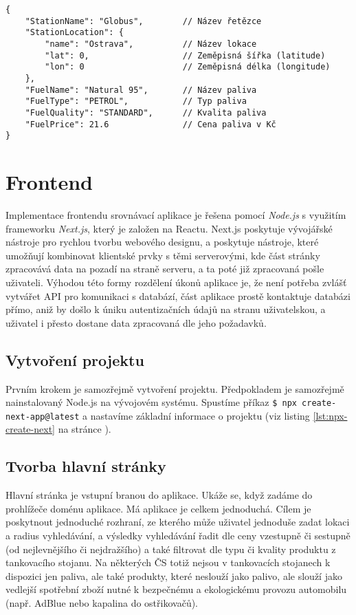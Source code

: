 \begin{lstlisting}[caption={JSON formát dat pro logovací knihovnu},label=lst:dbdata-json]
{
    "StationName": "Globus",        // Název řetězce
    "StationLocation": {
        "name": "Ostrava",          // Název lokace
        "lat": 0,                   // Zeměpisná šířka (latitude)
        "lon": 0                    // Zeměpisná délka (longitude)
    },
    "FuelName": "Natural 95",       // Název paliva
    "FuelType": "PETROL",           // Typ paliva
    "FuelQuality": "STANDARD",      // Kvalita paliva
    "FuelPrice": 21.6               // Cena paliva v Kč
}
\end{lstlisting}

\section{Frontend}

Implementace frontendu srovnávací aplikace je řešena pomocí \emph{Node.js}
s využitím frameworku \emph{Next.js}, který je založen na Reactu. Next.js
poskytuje vývojářské nástroje pro rychlou tvorbu webového designu, a poskytuje
nástroje, které umožňují kombinovat klientské prvky s těmi serverovými,
kde část stránky zpracovává data na pozadí na straně serveru, a ta poté již
zpracovaná pošle uživateli. Výhodou této formy rozdělení úkonů aplikace je,
že není potřeba zvlášť vytvářet API pro komunikaci s databází, část aplikace
prostě kontaktuje databázi přímo, aniž by došlo k úniku autentizačních
údajů na stranu uživatelskou, a uživatel i přesto dostane data zpracovaná
dle jeho požadavků.

\subsection{Vytvoření projektu}

Prvním krokem je samozřejmě vytvoření projektu. Předpokladem je samozřejmě
nainstalovaný Node.js na vývojovém systému. Spustíme příkaz
\texttt{\$ npx create-next-app@latest} a nastavíme základní informace
o projektu (viz listing \ref{lst:npx-create-next} na stránce
\pageref{lst:npx-create-next}).

\subsection{Tvorba hlavní stránky}

Hlavní stránka je vstupní branou do aplikace. Ukáže se, když zadáme
do prohlížeče doménu aplikace. Má aplikace je celkem jednoduchá. Cílem
je poskytnout jednoduché rozhraní, ze kterého může uživatel jednoduše
zadat lokaci a radius vyhledávání, a výsledky vyhledávání řadit dle
ceny vzestupně či sestupně (od nejlevnějšího či nejdražšího) a také filtrovat
dle typu či kvality produktu z tankovacího stojanu. Na některých ČS totiž
nejsou v tankovacích stojanech k dispozici jen paliva, ale také produkty,
které neslouží jako palivo, ale slouží jako vedlejší spotřební zboží nutné
k bezpečnému a ekologickému provozu automobilu (např. AdBlue nebo kapalina
do ostřikovačů).

